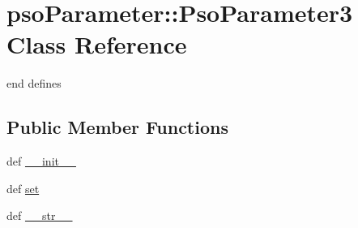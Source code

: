 \hypertarget{classpsoParameter_1_1PsoParameter3}{
\section{psoParameter::PsoParameter3 Class Reference}
\label{classpsoParameter_1_1PsoParameter3}
}
end defines  


\subsection*{Public Member Functions}
\begin{CompactItemize}
\item 
def \hyperlink{classpsoParameter_1_1PsoParameter3_4cb3d5081de0052e23fff2ef14c6b1ae}{\_\-\_\-init\_\-\_\-}
\item 
def \hyperlink{classpsoParameter_1_1PsoParameter3_c6c64ee3dd924e2e7733cb2f4d70492d}{set}
\item 
def \hyperlink{classpsoParameter_1_1PsoParameter3_b2d732e4d970cd2d1d187c2c3a6227f2}{\_\-\_\-str\_\-\_\-}
\end{CompactItemize}
